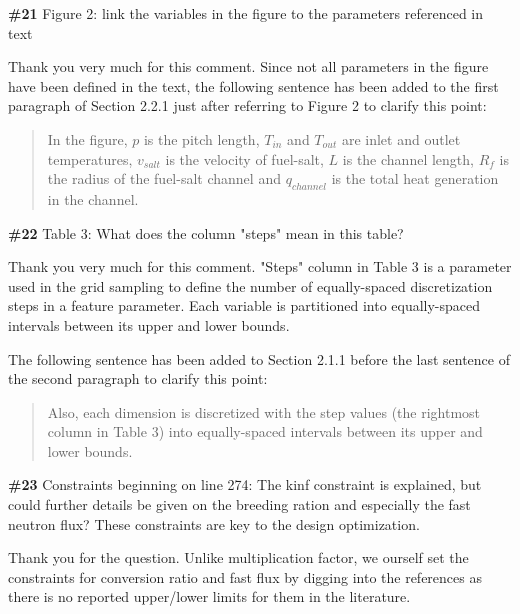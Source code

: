 \documentclass{ar2rc}
\begin{document}

    \Comment \textbf{\#21} Figure 2: link the variables in the figure to the parameters
    referenced in text

    \Response Thank you very much for this comment. Since not all parameters in the figure have been defined in the text, the following sentence has been added to the first paragraph of Section 2.2.1 just after referring to Figure 2 to clarify this point:\\

    \begin{quote}
        In the figure, $p$ is the pitch length, $T_{in}$ and $T_{out}$ are inlet
        and outlet temperatures, $v_{salt}$ is the velocity of fuel-salt, $L$ is
        the channel length, $R_f$ is the radius of the fuel-salt channel and
        $q_{channel}$ is the total heat generation in the channel.
    \end{quote}


    \Comment \textbf{\#22} Table 3: What does the column "steps" mean in this table?

    \Response Thank you very much for this comment. "Steps" column in Table 3 is a parameter used in the grid sampling to define the number of equally-spaced discretization steps in a feature parameter. Each variable is partitioned into equally-spaced intervals between its upper and lower bounds.

    The following sentence has been added to Section 2.1.1 before the last sentence of the second paragraph to clarify this point:\\

    \begin{quote}
        Also, each dimension is discretized with the step values (the rightmost column in Table 3) into equally-spaced intervals between its upper and lower bounds.
    \end{quote}


    \Comment \textbf{\#23} Constraints beginning on line 274: The kinf constraint is
    explained, but could further details be given on the breeding ration and
    especially the fast neutron flux? These constraints are key to the design
    optimization.

    \Response Thank you for the question. Unlike multiplication factor, we ourself set the constraints for conversion ratio and fast flux by digging into the references \cite{rykhlevskii2019, betzler2017, ashraf2019} as there is no reported upper/lower limits for them in the literature.
\end{document}
